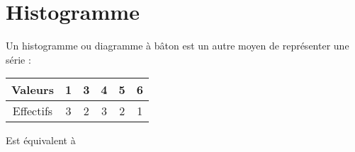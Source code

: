 \section{Histogramme}

Un histogramme ou diagramme à bâton est un autre moyen de représenter une série :

\begin{minipage}[c]{0.3\textwidth}
    \begin{center}
        \begin{tabular}{c*{5}{|c}}
            Valeurs & 1 & 3 & 4 &5 & 6 \\ \hline
            Effectifs & 3 & 2 & 3 & 2 & 1
        \end{tabular}
    \end{center}
\end{minipage}
\hfil
\begin{minipage}[c]{0.2\textwidth}
    \begin{center}
        Est équivalent à 
    \end{center}
\end{minipage}
\hfil
\begin{minipage}[c]{0.45\textwidth}
    \begin{center}
    \end{center}
\end{minipage}